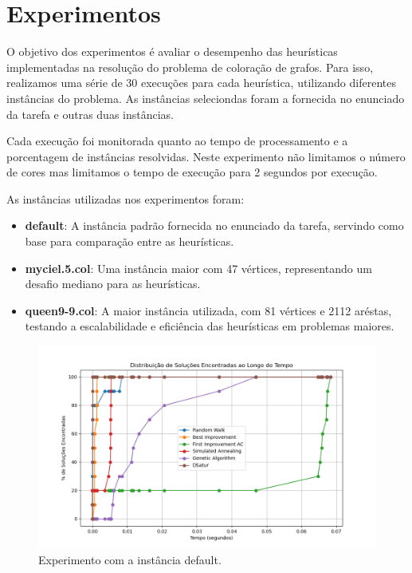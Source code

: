 \documentclass[12pt,a4paper]{article}
\begin{document}
\section{Experimentos}

O objetivo dos experimentos é avaliar o desempenho das heurísticas implementadas na resolução do problema de coloração de grafos. Para isso, realizamos uma série de 30 execuções para cada heurística, utilizando diferentes instâncias do problema. As instâncias seleciondas foram a fornecida no enunciado da tarefa e outras duas instâncias.

Cada execução foi monitorada quanto ao tempo de processamento e a porcentagem de instâncias resolvidas. Neste experimento não limitamos o número de cores mas limitamos o tempo de execução para 2 segundos por execução.

As instâncias utilizadas nos experimentos foram:

\begin{itemize}
 \item \textbf{default}: A instância padrão fornecida no enunciado da tarefa, servindo como base para comparação entre as heurísticas.
 \item \textbf{myciel.5.col}: Uma instância maior com 47 vértices, representando um desafio mediano para as heurísticas.
 \item \textbf{queen9-9.col}: A maior instância utilizada, com 81 vértices e 2112 aréstas, testando a escalabilidade e eficiência das heurísticas em problemas maiores.
\end{itemize}

\begin{figure}[H]
    \centering
    \includegraphics[width=1\textwidth]{./img/output-default.png}
    \caption{Experimento com a instância default.}
    \label{fig:experimento-default}
\end{figure}
\end{document}
